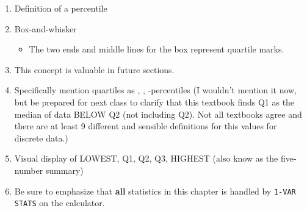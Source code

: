 \documentclass{article}
\begin{document}
\begin{enumerate}

    \item Definition of a percentile

    \item Box-and-whisker
    
        \begin{itemize}
        
        \item The two ends and middle lines for the box represent quartile marks.
        
        \end{itemize}

    \item This concept is valuable in future sections.

    \item Specifically mention quartiles as , , -percentiles (I wouldn’t mention it now, but be prepared for next class to clarify that this textbook finds Q1 as the median of data BELOW Q2 (not including Q2).  Not all textbooks agree and there are at least 9 different and sensible definitions for this values for discrete data.)

    \item Visual display of LOWEST, Q1, Q2, Q3, HIGHEST (also know as the five-number summary)
    
    \item Be sure to emphasize that {\bf all} statistics in this chapter is handled by \texttt{1-VAR STATS} on the calculator.
    
\end{enumerate}
\end{document}
